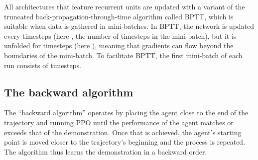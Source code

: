 \documentclass{nature}
\renewcommand*{\cite}[1]{\supercite{#1}}
\begin{document}
All architectures that feature recurrent units are updated with a variant of the truncated back-propagation-through-time algorithm called BPTT\cite{williams1990efficient}, which is suitable when data is gathered in mini-batches. In BPTT, the network is updated every  timesteps (here , the number of timesteps in the mini-batch), but it is unfolded for  timesteps (here ), meaning that gradients can flow beyond the boundaries of the mini-batch. To facilitate BPTT, the first mini-batch of each run consists of  timesteps.

\subsection{The backward algorithm}
\label{sec:backward}

The ``backward algorithm''\cite{salimans2018learning} operates by placing the agent close to the end of the trajectory and running PPO until the performance of the agent matches or exceeds that of the demonstration.
Once that is achieved, the agent's starting point is moved closer to the trajectory's beginning and the process is repeated.
The algorithm thus learns the demonstration in a backward order.
\end{document}
